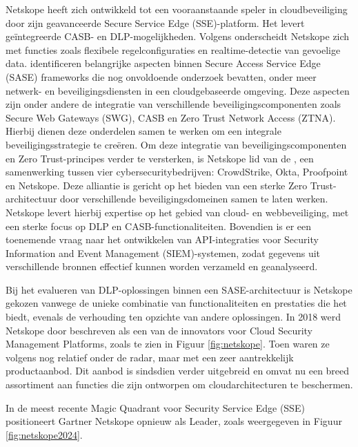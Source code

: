 Netskope heeft zich ontwikkeld tot een vooraanstaande speler in cloudbeveiliging door zijn geavanceerde Secure Service Edge (SSE)-platform. 
Het levert geïntegreerde CASB- en DLP-mogelijk\-heden. 
Volgens \textcite{Riley2018} onderscheidt Netskope zich met functies zoals flexibele regelconfiguraties en realtime-detectie van gevoelige data. 
\textcite{VanDerWalt2022} identificeren belangrijke aspecten binnen Secure Access Service Edge (SASE) frameworks die nog onvoldoende onderzoek bevatten,
onder meer netwerk- en beveiligingsdiensten in een cloudgebaseerde omgeving. 
Deze aspecten zijn onder andere de integratie van verschillende beveiligingscomponenten zoals Secure Web Gateways (SWG), CASB en Zero Trust Network Access (ZTNA). 
Hierbij dienen deze onderdelen samen te werken om een integrale beveiligingsstrategie te creëren. 
Om deze integratie van beveiligingscomponenten en Zero Trust-principes verder te versterken, 
is Netskope lid van de \textcite{SpectraAlliance2025}, een samenwerking tussen vier cybersecuritybedrijven: CrowdStrike, Okta, Proofpoint en Netskope.
Deze alliantie is gericht op het bieden van een sterke Zero Trust-architectuur door verschillende beveiligingsdomeinen samen te laten werken. 
Netskope levert hierbij expertise op het gebied van cloud- en webbeveiliging, met een sterke focus op DLP\- en CASB\--functionaliteiten.
Bovendien is er een toenemende vraag naar het ontwikkelen van API\--integraties voor Security Information and Event Management (SIEM)\--systemen, 
zodat gegevens uit verschillende bronnen effectief kunnen worden verzameld en geanalyseerd.

Bij het evalueren van DLP-oplossingen binnen een SASE-architectuur is Netskope gekozen vanwege de unieke combinatie van functionaliteiten en prestaties die het biedt, 
evenals de verhouding ten opzichte van andere oplossingen. In 2018 werd Netskope door \textcite{Hille2018} beschreven als een van de innovators voor Cloud Security Management Platforms, 
zoals te zien in Figuur \ref{fig:netskope}.  
Toen waren ze volgens \textcite{Hille2018} nog relatief onder de radar, maar met een zeer aantrekkelijk productaanbod. 
Dit aanbod is sindsdien verder uitgebreid en omvat nu een breed assortiment aan functies die zijn ontworpen om cloudarchitecturen te beschermen. 

In de meest recente Magic Quadrant voor Security Service Edge (SSE) positioneert Gartner Netskope opnieuw als Leader, zoals weergegeven in Figuur \ref{fig:netskope2024}.

